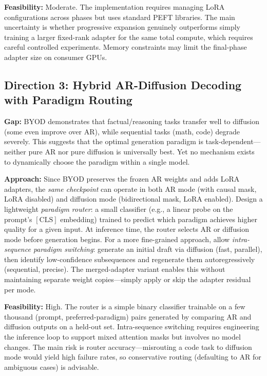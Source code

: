 \documentclass[11pt,a4paper]{article}
\begin{document}
\textbf{Feasibility:} Moderate. The implementation requires managing LoRA configurations across phases but uses standard PEFT libraries. The main uncertainty is whether progressive expansion genuinely outperforms simply training a larger fixed-rank adapter for the same total compute, which requires careful controlled experiments. Memory constraints may limit the final-phase adapter size on consumer GPUs.

\subsection{Direction 3: Hybrid AR-Diffusion Decoding with Paradigm Routing}
\textbf{Gap:} BYOD demonstrates that factual/reasoning tasks transfer well to diffusion (some even improve over AR), while sequential tasks (math, code) degrade severely. This suggests that the optimal generation paradigm is task-dependent---neither pure AR nor pure diffusion is universally best. Yet no mechanism exists to dynamically choose the paradigm within a single model.

\textbf{Approach:} Since BYOD preserves the frozen AR weights and adds LoRA adapters, the \emph{same checkpoint} can operate in both AR mode (with causal mask, LoRA disabled) and diffusion mode (bidirectional mask, LoRA enabled). Design a lightweight \emph{paradigm router}: a small classifier (e.g., a linear probe on the prompt's $[\text{CLS}]$ embedding) trained to predict which paradigm achieves higher quality for a given input. At inference time, the router selects AR or diffusion mode before generation begins. For a more fine-grained approach, allow \emph{intra-sequence paradigm switching}: generate an initial draft via diffusion (fast, parallel), then identify low-confidence subsequences and regenerate them autoregressively (sequential, precise). The merged-adapter variant enables this without maintaining separate weight copies---simply apply or skip the adapter residual per mode.

\textbf{Feasibility:} High. The router is a simple binary classifier trainable on a few thousand (prompt, preferred-paradigm) pairs generated by comparing AR and diffusion outputs on a held-out set. Intra-sequence switching requires engineering the inference loop to support mixed attention masks but involves no model changes. The main risk is router accuracy---misrouting a code task to diffusion mode would yield high failure rates, so conservative routing (defaulting to AR for ambiguous cases) is advisable.
\end{document}
